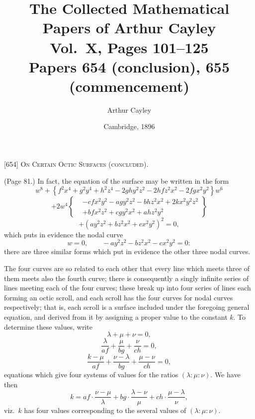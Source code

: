 \documentclass[11pt,a4paper]{article}
\title{The Collected Mathematical Papers of Arthur Cayley\\[6pt]
\large Vol.~X, Pages 101--125 \\[4pt]
\normalsize Papers 654 (conclusion), 655 (commencement)}
\author{Arthur Cayley}
\date{Cambridge, 1896}
\begin{document}
\maketitle
\thispagestyle{fancy}

\setcounter{page}{101}


\begin{center}
\textsc{[654] On Certain Octic Surfaces (concluded).}
\end{center}

\medskip

\noindent (Page 81.) In fact, the equation of the surface may be written in the form
\[
w^{8} + \left\{ f^{2}x^{4} + g^{2}y^{4} + h^{2}z^{4} - 2ghy^{2}z^{2} - 2hfz^{2}x^{2} - 2fgx^{2}y^{2} \right\} w^{6}
\]
\[
+ 2w^{4}\left\{
\begin{aligned}
&-cfx^{2}y^{2} - agy^{2}z^{2} - bhz^{2}x^{2} + 2kx^{2}y^{2}z^{2} \\
&+ bfx^{2}z^{2} + cgy^{2}x^{2} + ahz^{2}y^{2}
\end{aligned}
\right\}
\]
\[
+ \left( ay^{2}z^{2} + bz^{2}x^{2} + cx^{2}y^{2} \right)^{2} = 0,
\]
which puts in evidence the nodal curve
\[
w = 0, \qquad - ay^{2}z^{2} - bz^{2}x^{2} - cx^{2}y^{2} = 0:
\]
there are three similar forms which put in evidence the other three nodal curves.

The four curves are so related to each other that every line which meets three of them meets also the fourth curve; there is consequently a singly infinite series of lines meeting each of the four curves; these break up into four series of lines each forming an octic scroll, and each scroll has the four curves for nodal curves respectively; that is, each scroll is a surface included under the foregoing general equation, and derived from it by assigning a proper value to the constant $k$. To determine these values, write
\[
\lambda + \mu + \nu = 0,
\]
\[
\frac{\lambda}{af} + \frac{\mu}{bg} + \frac{\nu}{ch} = 0,
\]
\[
\frac{k - \mu}{af} + \frac{\nu - \lambda}{bg} + \frac{\mu - \nu}{ch} = 0,
\]
equations which give four systems of values for the ratios $(\lambda : \mu : \nu)$. We have then
\[
k = af \cdot \frac{\nu - \mu}{\lambda} + bg \cdot \frac{\lambda - \nu}{\mu} + ch \cdot \frac{\mu - \lambda}{\nu},
\]
viz.\ $k$ has four values corresponding to the several values of $(\lambda : \mu : \nu)$.
\end{document}
